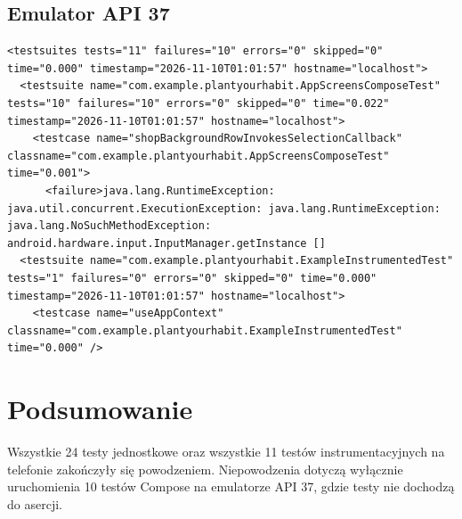 \documentclass[a4paper,12pt]{article}
\begin{document}
\subsection{Emulator API 37}
\begin{verbatim}
<testsuites tests="11" failures="10" errors="0" skipped="0" time="0.000" timestamp="2026-11-10T01:01:57" hostname="localhost">
  <testsuite name="com.example.plantyourhabit.AppScreensComposeTest" tests="10" failures="10" errors="0" skipped="0" time="0.022" timestamp="2026-11-10T01:01:57" hostname="localhost">
    <testcase name="shopBackgroundRowInvokesSelectionCallback" classname="com.example.plantyourhabit.AppScreensComposeTest" time="0.001">
      <failure>java.lang.RuntimeException: java.util.concurrent.ExecutionException: java.lang.RuntimeException: java.lang.NoSuchMethodException: android.hardware.input.InputManager.getInstance []
  <testsuite name="com.example.plantyourhabit.ExampleInstrumentedTest" tests="1" failures="0" errors="0" skipped="0" time="0.000" timestamp="2026-11-10T01:01:57" hostname="localhost">
    <testcase name="useAppContext" classname="com.example.plantyourhabit.ExampleInstrumentedTest" time="0.000" />
\end{verbatim}

\section{Podsumowanie}
Wszystkie 24 testy jednostkowe oraz wszystkie 11 testów instrumentacyjnych na telefonie zakończyły się powodzeniem. Niepowodzenia dotyczą wyłącznie uruchomienia 10 testów Compose na emulatorze API 37, gdzie testy nie dochodzą do asercji.
\end{document}
